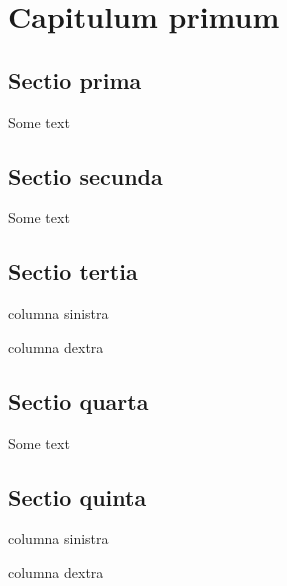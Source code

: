 \documentclass{book}
\begin{document}
\tableofcontents

\chapter{Capitulum primum}

\startcontents[section]

\section{Sectio prima}
Some text

\section{Sectio secunda}
Some text

\section{Sectio tertia}
\begin{pairs}

\begin{Leftside}
\beginnumbering
\pstart
columna sinistra
\pend
\endnumbering
\end{Leftside}

\begin{Rightside}
\beginnumbering
\pstart
columna dextra
\pend
\endnumbering
\end{Rightside}

\end{pairs}
\Columns

\section{Sectio quarta}
Some text

\section{Sectio quinta}
\begin{pairs}

\begin{Leftside}
\beginnumbering
\pstart
columna sinistra
\pend
\endnumbering
\end{Leftside}

\begin{Rightside}
\beginnumbering
\pstart
columna dextra
\pend
\endnumbering
\end{Rightside}

\end{pairs}
\Columns

\stopcontents[section]
\contentsfinish
\end{document}
